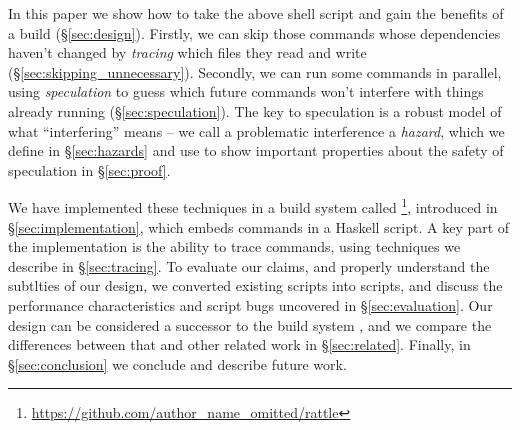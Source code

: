 In this paper we show how to take the above shell script and gain the benefits of a \Make build (\S\ref{sec:design}). Firstly, we can skip those commands whose dependencies haven't changed by \emph{tracing} which files they read and write (\S\ref{sec:skipping_unnecessary}). Secondly, we can run some commands in parallel, using \emph{speculation} to guess which future commands won't interfere with things already running (\S\ref{sec:speculation}). The key to speculation is a robust model of what ``interfering'' means -- we call a problematic interference a \emph{hazard}, which we define in \S\ref{sec:hazards} and use to show important properties about the safety of speculation in \S\ref{sec:proof}.

We have implemented these techniques in a build system called \Rattle\footnote{\url{https://github.com/author_name_omitted/rattle}}, introduced in \S\ref{sec:implementation}, which embeds commands in a Haskell script. A key part of the implementation is the ability to trace commands, using techniques we describe in \S\ref{sec:tracing}. To evaluate our claims, and properly understand the subtlties of our design, we converted existing \Make scripts into \Rattle scripts, and discuss the performance characteristics and \Make script bugs uncovered in \S\ref{sec:evaluation}. Our design can be considered a successor to the \Memoize build system \cite{memoize}, and we compare the differences between that and other related work in \S\ref{sec:related}. Finally, in \S\ref{sec:conclusion} we conclude and describe future work.
